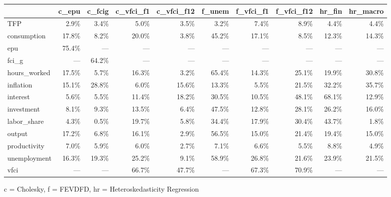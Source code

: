 
\fontsize{12.0pt}{14.4pt}\selectfont
\begin{tabular*}{\linewidth}{@{\extracolsep{\fill}}l|rrrrrrrrr}
\toprule
 & c\_epu & c\_fcig & c\_vfci\_f1 & c\_vfci\_f12 & f\_unem & f\_vfci\_f1 & f\_vfci\_f12 & hr\_fin & hr\_macro \\ 
\midrule\addlinespace[2.5pt]
TFP & 2.9\% & 3.4\% & 5.0\% & 3.5\% & 3.2\% & 7.4\% & 8.9\% & 4.4\% & 4.4\% \\ 
consumption & 17.8\% & 8.2\% & 20.0\% & 3.8\% & 45.2\% & 17.1\% & 8.5\% & 12.3\% & 14.3\% \\ 
epu & 75.4\% & — & — & — & — & — & — & — & — \\ 
fci\_g & — & 64.2\% & — & — & — & — & — & — & — \\ 
hours\_worked & 17.5\% & 5.7\% & 16.3\% & 3.2\% & 65.4\% & 14.3\% & 25.1\% & 19.9\% & 30.8\% \\ 
inflation & 15.1\% & 28.8\% & 6.0\% & 15.6\% & 13.3\% & 5.5\% & 21.5\% & 32.2\% & 35.7\% \\ 
interest & 5.6\% & 5.5\% & 11.4\% & 18.2\% & 30.5\% & 10.5\% & 48.1\% & 68.1\% & 12.9\% \\ 
investment & 8.1\% & 9.3\% & 13.5\% & 6.4\% & 47.5\% & 12.8\% & 28.1\% & 26.2\% & 16.0\% \\ 
labor\_share & 4.3\% & 0.5\% & 19.7\% & 5.8\% & 34.4\% & 17.9\% & 30.4\% & 43.7\% & 1.8\% \\ 
output & 17.2\% & 6.8\% & 16.1\% & 2.9\% & 56.5\% & 15.0\% & 21.4\% & 19.4\% & 15.0\% \\ 
productivity & 7.0\% & 5.9\% & 6.0\% & 2.7\% & 7.1\% & 6.6\% & 5.5\% & 8.8\% & 4.9\% \\ 
unemployment & 16.3\% & 19.3\% & 25.2\% & 9.1\% & 58.9\% & 26.8\% & 21.6\% & 23.9\% & 21.5\% \\ 
vfci & — & — & 66.7\% & 47.7\% & — & 67.3\% & 70.9\% & — & — \\ 
\bottomrule
\end{tabular*}
\begin{minipage}{\linewidth}
c = Cholesky, f = FEVDFD, hr = Heteroskedasticity Regression\\
\end{minipage}


